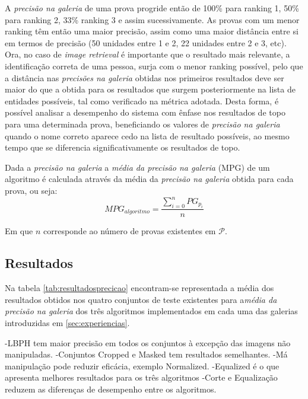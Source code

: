 A \textit{precisão na galeria} de uma prova progride então de 100\% para ranking 1, 50\% para ranking 2, 33\% ranking 3 e assim sucessivamente. As provas com um menor ranking têm então uma maior precisão, assim como uma maior distância entre si em termos de precisão (50 unidades entre 1 e 2, 22 unidades entre 2 e 3, etc). Ora, no caso de \textit{image retrieval} é importante que o resultado mais relevante, a identificação correta de uma pessoa, surja com o menor ranking possível, pelo que a distância nas \textit{precisões na galeria} obtidas nos primeiros resultados deve ser maior do que a obtida para os resultados que surgem posteriormente na lista de entidades possíveis, tal como verificado na métrica adotada. Desta forma, é possível analisar a desempenho do sistema com ênfase nos resultados de topo para uma determinada prova, beneficiando os valores de \textit{precisão na galeria} quando o nome correto aparece cedo na lista de resultado possíveis, ao mesmo tempo que se diferencia significativamente os resultados de topo.

Dada a \textit{precisão na galeria} a \textit{média da precisão na galeria} (MPG) de um algoritmo é calculada através da média da \textit{precisão na galeria} obtida para cada prova, ou seja:
\begin{equation}
MPG_{algoritmo} = \frac{ \sum\limits_{i=0}^{n} PG_{p_i} }{n}
\end{equation}

Em que $n$ corresponde ao número de provas existentes em $\mathscr{P}$.

\subsection{Resultados}
Na tabela \ref{tab:resultadosprecicao} encontram-se representada a média dos resultados obtidos nos quatro conjuntos de teste existentes para a\textit{média da precisão na galeria} dos três algoritmos implementados em cada uma das galerias introduzidas em \ref{sec:experiencias}.

-LBPH tem maior precisão em todos os conjuntos à excepção das imagens não manipuladas.
-Conjuntos Cropped e Masked tem resultados semelhantes.
-Má manipulação pode reduzir eficácia, exemplo Normalized.
-Equalized é o que apresenta melhores resultados para os três algoritmos
-Corte e Equalização reduzem as diferenças de desempenho entre os algoritmos.

